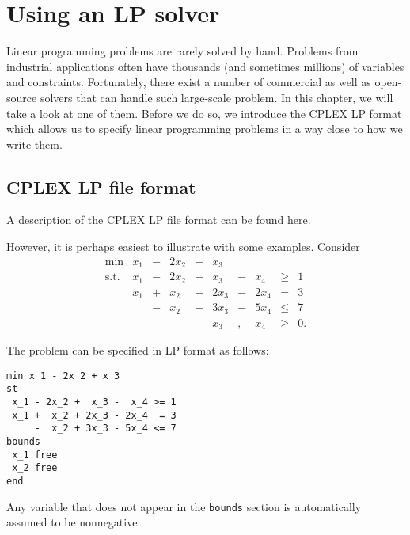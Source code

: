 %

\chapter{Using an LP solver}\label{using-an-lp-solver}

Linear programming problems are rarely solved by hand. Problems from
industrial applications often have thousands (and sometimes millions) of
variables and constraints. Fortunately, there exist a number of
commercial as well as open-source solvers that can handle such
large-scale problem. In this chapter, we will take a look at one of
them. Before we do so, we introduce the CPLEX LP format which allows us
to specify linear programming problems in a way close to how we write
them.

\section{CPLEX LP file format}\label{cplex-lp-file-format}

A description of the CPLEX LP file format can be found here.

However, it is perhaps easiest to illustrate with some examples.
Consider \[\begin{array}{rrcrcrcrcl}
\min & x_1 & - & 2x_2 & +& x_3 &   &  &  \\
\mbox{s.t.}
 & x_1 & - &  2x_2 & + &  x_3 & - & x_4  & \geq & 1  \\
  & x_1 & + &  x_2 & + & 2x_3 & - & 2x_4 &  = & 3  \\
 &  & - &  x_2 & + & 3 x_3 & - & 5x_4  & \leq & 7  \\
   &  &  & & & x_3 & , & x_4 & \geq & 0.
\end{array}\]

The problem can be specified in LP format as follows:

\begin{verbatim}
min x_1 - 2x_2 + x_3
st
 x_1 - 2x_2 +  x_3 -  x_4 >= 1
 x_1 +  x_2 + 2x_3 - 2x_4  = 3
     -  x_2 + 3x_3 - 5x_4 <= 7
bounds
 x_1 free
 x_2 free
end
\end{verbatim}

Any variable that does not appear in the \texttt{bounds} section is
automatically assumed to be nonnegative.


